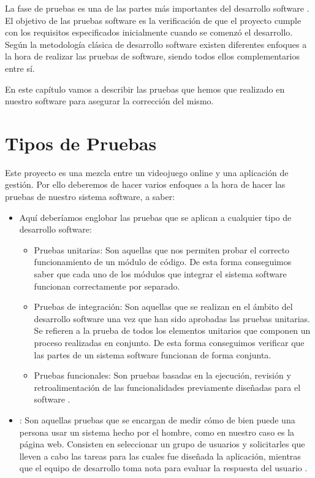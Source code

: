 

La fase de pruebas es una de las partes más importantes del desarrollo software
\cite{test:myers}. El objetivo de las pruebas software es la verificación de que
el proyecto cumple con los requisitos especificados inicialmente cuando se
comenzó el desarrollo. Según la metodología clásica de desarrollo software
existen diferentes enfoques a la hora de realizar las pruebas de software,
siendo todos ellos complementarios entre sí.

En este capítulo vamos a describir las pruebas que hemos que realizado en
nuestro software para asegurar la corrección del mismo.

\section{Tipos de Pruebas}
Este proyecto es una mezcla entre un videojuego online y una aplicación de
gestión. Por ello deberemos de hacer varios enfoques a la hora de hacer las
pruebas de nuestro sistema software, a saber:

\begin{itemize}
\item {} Aquí deberíamos englobar las pruebas que se
  aplican a cualquier tipo de desarrollo software:
  \begin{itemize}
  \item Pruebas unitarias: Son aquellas que nos permiten probar el correcto
    funcionamiento de un módulo de código. De esta forma conseguimos saber que
    cada uno de los módulos que integrar el sistema software funcionan
    correctamente por separado. \cite{test:unitaria}
  \item Pruebas de integración: Son aquellas que se realizan en el ámbito del
    desarrollo software una vez que han sido aprobadas las pruebas unitarias. Se
    refieren a la prueba de todos los elementos unitarios que componen un
    proceso realizadas en conjunto. De esta forma conseguimos verificar que las
    partes de un sistema software funcionan de forma
    conjunta. \cite{test:integracion}
  \item Pruebas funcionales: Son pruebas basadas en la ejecución, revisión y
    retroalimentación de las funcionalidades previamente diseñadas para el
    software \cite{test:funcionales}.
  \end{itemize}
\item {}: Son aquellas pruebas que se encargan de
  medir cómo de bien puede una persona usar un sistema hecho por el hombre, como
  en nuestro caso es la página web. Consisten en seleccionar un grupo de
  usuarios y solicitarles que lleven a cabo las tareas para las cuales fue
  diseñada la aplicación, mientras que el equipo de desarrollo toma nota para
  evaluar la respuesta del usuario \cite{test:usability}.
\end{itemize}

